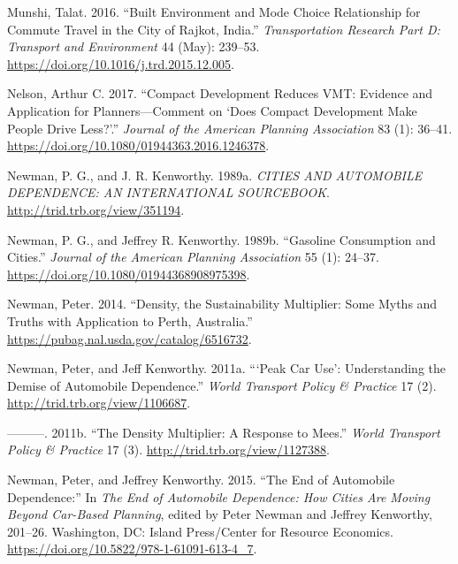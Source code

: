 \documentclass[
  12pt,
]{article}
\newlength{\cslhangindent}
\newlength{\cslentryspacingunit} %
\newenvironment{CSLReferences}[2] %
 {%
  \setlength{\parindent}{0pt}
  \ifodd #1
  \let\oldpar\par
  \def\par{\hangindent=\cslhangindent\oldpar}
  \fi
  \setlength{\parskip}{#2\cslentryspacingunit}
 }%
 {}
\begin{document}
\begin{CSLReferences}{1}{0}
\leavevmode{}%
Munshi, Talat. 2016. {``Built Environment and Mode Choice Relationship for Commute Travel in the City of {Rajkot}, {India}.''} \emph{Transportation Research Part D: Transport and Environment} 44 (May): 239--53. \url{https://doi.org/10.1016/j.trd.2015.12.005}.

\leavevmode{}%
Nelson, Arthur C. 2017. {``Compact {Development Reduces VMT}: {Evidence} and {Application} for {Planners}---{Comment} on {`{Does Compact Development Make People Drive Less}?'}.''} \emph{Journal of the American Planning Association} 83 (1): 36--41. \url{https://doi.org/10.1080/01944363.2016.1246378}.

\leavevmode{}%
Newman, P. G., and J. R. Kenworthy. 1989a. \emph{{CITIES AND AUTOMOBILE DEPENDENCE}: {AN INTERNATIONAL SOURCEBOOK}}. \url{http://trid.trb.org/view/351194}.

\leavevmode{}%
Newman, P. G., and Jeffrey R. Kenworthy. 1989b. {``Gasoline {Consumption} and {Cities}.''} \emph{Journal of the American Planning Association} 55 (1): 24--37. \url{https://doi.org/10.1080/01944368908975398}.

\leavevmode{}%
Newman, Peter. 2014. {``Density, the {Sustainability Multiplier}: {Some Myths} and {Truths} with {Application} to {Perth}, {Australia}.''} \url{https://pubag.nal.usda.gov/catalog/6516732}.

\leavevmode{}%
Newman, Peter, and Jeff Kenworthy. 2011a. {``{`{Peak Car Use}'}: {Understanding} the {Demise} of {Automobile Dependence}.''} \emph{World Transport Policy \& Practice} 17 (2). \url{http://trid.trb.org/view/1106687}.

\leavevmode{}%
---------. 2011b. {``The {Density Multiplier}: {A Response} to {Mees}.''} \emph{World Transport Policy \& Practice} 17 (3). \url{http://trid.trb.org/view/1127388}.

\leavevmode{}%
Newman, Peter, and Jeffrey Kenworthy. 2015. {``The {End} of {Automobile Dependence}:''} In \emph{The {End} of {Automobile Dependence}: {How Cities Are Moving Beyond Car-Based Planning}}, edited by Peter Newman and Jeffrey Kenworthy, 201--26. {Washington, DC}: {Island Press/Center for Resource Economics}. \url{https://doi.org/10.5822/978-1-61091-613-4_7}.


\end{CSLReferences}
\end{document}
